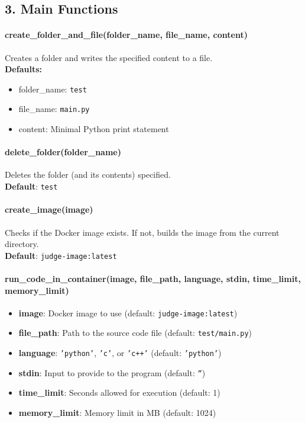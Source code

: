 \documentclass{article}
\begin{document}
\subsection*{3. Main Functions}

\paragraph{create\_folder\_and\_file(folder\_name, file\_name, content)}
Creates a folder and writes the specified content to a file. \\
\textbf{Defaults:}
\begin{itemize}
    \item folder\_name: \texttt{test}
    \item file\_name: \texttt{main.py}
    \item content: Minimal Python print statement
\end{itemize}

\paragraph{delete\_folder(folder\_name)}
Deletes the folder (and its contents) specified.\\
\textbf{Default}: \texttt{test}

\paragraph{create\_image(image)}
Checks if the Docker image exists. If not, builds the image from the current directory.\\
\textbf{Default}: \texttt{judge-image:latest}

\paragraph{run\_code\_in\_container(image, file\_path, language, stdin, time\_limit, memory\_limit)}
\begin{itemize}
    \item \textbf{image}: Docker image to use (default: \texttt{judge-image:latest})
    \item \textbf{file\_path}: Path to the source code file (default: \texttt{test/main.py})
    \item \textbf{language}: \texttt{'python'}, \texttt{'c'}, or \texttt{'c++'} (default: \texttt{'python'})
    \item \textbf{stdin}: Input to provide to the program (default: \texttt{''})
    \item \textbf{time\_limit}: Seconds allowed for execution (default: 1)
    \item \textbf{memory\_limit}: Memory limit in MB (default: 1024)
\end{itemize}
\end{document}
